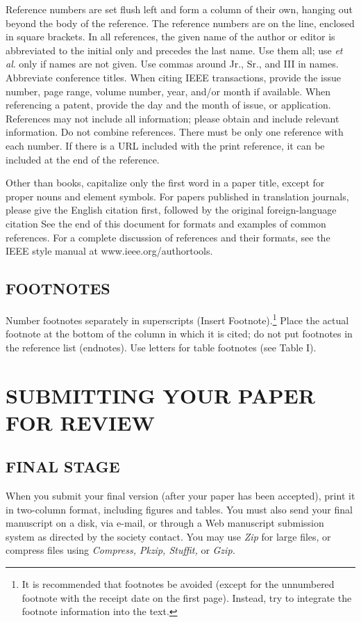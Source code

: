 \documentclass{IEEEoj}
\begin{document}
Reference numbers are set flush left and form a column of their own, hanging 
out beyond the body of the reference. The reference numbers are on the line, 
enclosed in square brackets. In all references, the given name of the author 
or editor is abbreviated to the initial only and precedes the last name. Use 
them all; use \textit{et al}. only if names are not given. Use commas around Jr., Sr., and 
III in names. Abbreviate conference titles. When citing IEEE transactions, 
provide the issue number, page range, volume number, year, and/or month if 
available. When referencing a patent, provide the day and the month of 
issue, or application. References may not include all information; please 
obtain and include relevant information. Do not combine references. There 
must be only one reference with each number. If there is a URL included with 
the print reference, it can be included at the end of the reference. 

Other than books, capitalize only the first word in a paper title, except 
for proper nouns and element symbols. For papers published in translation 
journals, please give the English citation first, followed by the original 
foreign-language citation See the end of this document for formats and 
examples of common references. For a complete discussion of references and 
their formats, see the IEEE style manual at www.ieee.org/authortools.


\subsection{FOOTNOTES}
Number footnotes separately in superscripts (Insert\textbar 
Footnote).\footnote{It is recommended that footnotes be avoided (except for 
the unnumbered footnote with the receipt date on the first page). Instead, 
try to integrate the footnote information into the text.} Place the actual 
footnote at the bottom of the column in which it is cited; do not put 
footnotes in the reference list (endnotes). Use letters for table footnotes 
(see Table I). 

\section{SUBMITTING YOUR PAPER FOR REVIEW}

\subsection{FINAL STAGE}
When you submit your final version (after your paper has been accepted), 
print it in two-column format, including figures and tables. You must also 
send your final manuscript on a disk, via e-mail, or through a Web 
manuscript submission system as directed by the society contact. You may use 
\textit{Zip} for large files, or compress files using \textit{Compress, Pkzip, Stuffit,} or \textit{Gzip.} 
\end{document}
